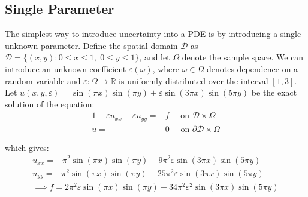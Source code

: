 \documentclass[11pt]{article}
\numberwithin{equation}{section}
\begin{document}
\subsection{Single Parameter}
The simplest way to introduce uncertainty into a PDE is by introducing a single unknown parameter. Define the spatial domain $\mathcal{D}$ as $\mathcal{D} = \{(x,y) : 0 \leq x \leq 1, \; 0 \leq y \leq 1 \}$, and let $\Omega$ denote the sample space. We can introduce an unknown coefficient $\varepsilon(\omega)$, where $\omega \in \Omega$ denotes dependence on a random variable and $\varepsilon: \Omega \rightarrow \mathbb{R}$ is uniformly distributed over the interval $[1,3]$. Let $u(x,y,\varepsilon) = \sin(\pi x)\sin(\pi y) + \varepsilon \sin(3 \pi x) \sin(5 \pi y)$ be the exact solution of the equation:
\begin{alignat}{1}
-\varepsilon u_{xx} -\varepsilon u_{yy} = {}& f \quad \text{ on } \mathcal{D} \times \Omega \nonumber \\
u = {}& 0 \quad \text{ on } \partial \mathcal{D} \times \Omega
\end{alignat}

which gives:
\begin{equation}
\begin{split}
u_{xx} = -\pi^2 \sin(\pi x) \sin(\pi y) - 9\pi^2 \varepsilon \sin(3\pi x) \sin(5\pi y) \\
u_{yy} = -\pi^2 \sin(\pi x) \sin(\pi y) - 25\pi^2 \varepsilon \sin(3\pi x) \sin(5\pi y) \\
\implies f = 2\pi^2 \varepsilon \sin(\pi x) \sin(\pi y) + 34\pi^2 \varepsilon^2 \sin(3\pi x) \sin(5\pi y)
\end{split}
\end{equation}
\end{document}
